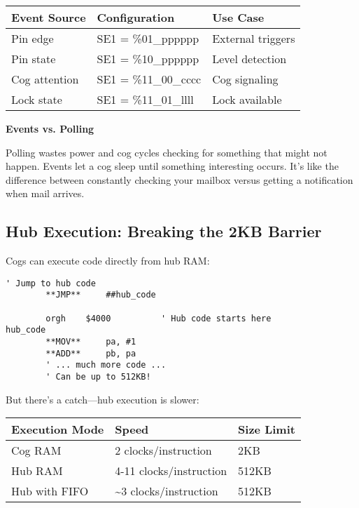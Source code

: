 \documentclass[11pt]{book}
\begin{document}
\begin{longtable}[]{@{}lll@{}}
\toprule
Event Source & Configuration & Use Case \\
\midrule
\endhead
Pin edge & SE1 = \%01\_pppppp & External triggers \\
Pin state & SE1 = \%10\_pppppp & Level detection \\
Cog attention & SE1 = \%11\_00\_cccc & Cog signaling \\
Lock state & SE1 = \%11\_01\_llll & Lock available \\
\bottomrule
\end{longtable}

\begin{interlude}
\textbf{Events vs. Polling}

Polling wastes power and cog cycles checking for something that might not happen. Events let a cog sleep until something interesting occurs. It's like the difference between constantly checking your mailbox versus getting a notification when mail arrives.
\end{interlude}

\hypertarget{hub-execution-breaking-the-2kb-barrier}{%
\subsection{Hub Execution: Breaking the 2KB
Barrier}\label{hub-execution-breaking-the-2kb-barrier}}

Cogs can execute code directly from hub RAM:

\begin{lstlisting}
' Jump to hub code
        **JMP**     ##hub_code
        
        orgh    $4000          ' Hub code starts here
hub_code
        **MOV**     pa, #1
        **ADD**     pb, pa
        ' ... much more code ...
        ' Can be up to 512KB!
\end{lstlisting}

But there's a catch---hub execution is slower:

\begin{longtable}[]{@{}lll@{}}
\toprule
Execution Mode & Speed & Size Limit \\
\midrule
\endhead
Cog RAM & 2 clocks/instruction & 2KB \\
Hub RAM & 4-11 clocks/instruction & 512KB \\
Hub with FIFO & \textasciitilde{}3 clocks/instruction & 512KB \\
\bottomrule
\end{longtable}
\end{document}
